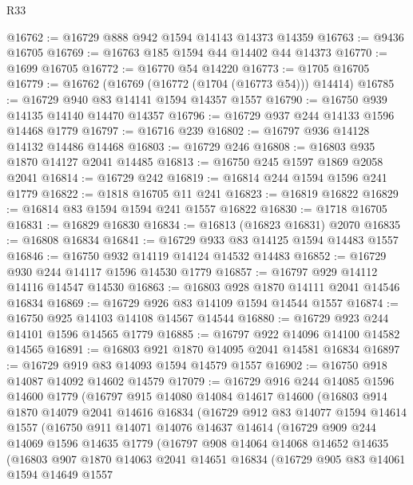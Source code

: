 \begin{lexlean}{R33}
\begin{coremodule}
@16762 := @16729 @888 @942 @1594 @14143 @14373 @14359
@16763 := @9436 @16705
@16769 := @16763 @185 @1594 @44 @14402 @44 @14373
@16770 := @1699 @16705
@16772 := @16770 @54 @14220
@16773 := @1705 @16705
@16779 := @16762 (@16769 (@16772 (@1704 (@16773 @54))) @14414)
@16785 := @16729 @940 @83 @14141 @1594 @14357 @1557
@16790 := @16750 @939 @14135 @14140 @14470 @14357
@16796 := @16729 @937 @244 @14133 @1596 @14468 @1779
@16797 := @16716 @239
@16802 := @16797 @936 @14128 @14132 @14486 @14468
@16803 := @16729 @246
@16808 := @16803 @935 @1870 @14127 @2041 @14485
@16813 := @16750 @245 @1597 @1869 @2058 @2041
@16814 := @16729 @242
@16819 := @16814 @244 @1594 @1596 @241 @1779
@16822 := @1818 @16705 @11 @241
@16823 := @16819 @16822
@16829 := @16814 @83 @1594 @1594 @241 @1557 @16822
@16830 := @1718 @16705
@16831 := @16829 @16830
@16834 := @16813 (@16823 @16831) @2070
@16835 := @16808 @16834
@16841 := @16729 @933 @83 @14125 @1594 @14483 @1557
@16846 := @16750 @932 @14119 @14124 @14532 @14483
@16852 := @16729 @930 @244 @14117 @1596 @14530 @1779
@16857 := @16797 @929 @14112 @14116 @14547 @14530
@16863 := @16803 @928 @1870 @14111 @2041 @14546 @16834
@16869 := @16729 @926 @83 @14109 @1594 @14544 @1557
@16874 := @16750 @925 @14103 @14108 @14567 @14544
@16880 := @16729 @923 @244 @14101 @1596 @14565 @1779
@16885 := @16797 @922 @14096 @14100 @14582 @14565
@16891 := @16803 @921 @1870 @14095 @2041 @14581 @16834
@16897 := @16729 @919 @83 @14093 @1594 @14579 @1557
@16902 := @16750 @918 @14087 @14092 @14602 @14579
@17079 := @16729
    @916
    @244
    @14085
    @1596
    @14600
    @1779
    (@16797
      @915
      @14080
      @14084
      @14617
      @14600
      (@16803
        @914
        @1870
        @14079
        @2041
        @14616
        @16834
        (@16729
          @912
          @83
          @14077
          @1594
          @14614
          @1557
          (@16750
            @911
            @14071
            @14076
            @14637
            @14614
            (@16729
              @909
              @244
              @14069
              @1596
              @14635
              @1779
              (@16797
                @908
                @14064
                @14068
                @14652
                @14635
                (@16803
                  @907
                  @1870
                  @14063
                  @2041
                  @14651
                  @16834
                  (@16729
                    @905
                    @83
                    @14061
                    @1594
                    @14649
                    @1557

\end{coremodule}
\end{lexlean}
